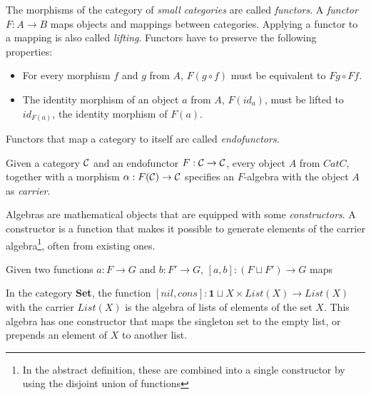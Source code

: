 \begin{definition}
    The morphisms of the category of \textit{small categories} are called \textit{functors}.
    A \textit{functor} $F : A \rightarrow B$ maps objects and mappings between categories.
    Applying a functor to a mapping is also called \textit{lifting}.
    Functors have to preserve the following properties:

    \begin{itemize}
        \item For every morphism $f$ and $g$ from $A$, $F (g \circ f)$
              must be equivalent to $F g \circ F f$.
        \item The identity morphism of an object $a$ from $A$, $F(id_{a}) $,
              must be lifted to $id_{F(a)}$, the identity morphism of $F(a)$.
    \end{itemize}

    Functors that map a category to itself are called \textit{endofunctors}.
\end{definition}

\begin{definition}
    Given a category $\mathcal{C}$ and an endofunctor $F : \mathcal{C} \rightarrow \mathcal{C}$,
    every object $A$ from $Cat{C}$, together with a morphism
    $\alpha : F(\mathcal{C}) \rightarrow \mathcal{C}$
    specifies an $F$-algebra with the object $A$ as \textit{carrier}.
\end{definition}

Algebras are mathematical objects that are equipped with some \textit{constructors}.
A constructor is a function that makes it possible to generate elements of
the carrier algebra\footnote{In the abstract definition, these are combined into a single
constructor by using the disjoint union of functions}, often from existing ones.

\begin{definition}
    Given two functions $a : F \rightarrow G$ and $b : F' \rightarrow G$,
    $[a, b] : (F \sqcup F') \rightarrow G$ maps

\end{definition}

\begin{example}
    In the category \textbf{Set}, the function
    $[\textit{nil}, \textit{cons}] : \textbf{1} \sqcup X \times List(X) \rightarrow List(X)$
    with the carrier $List(X)$ is the algebra of lists of elements of the set $X$.
    This algebra has one constructor that maps the singleton set to the empty list,
    or prepends an element of $X$ to another list.
\end{example}

